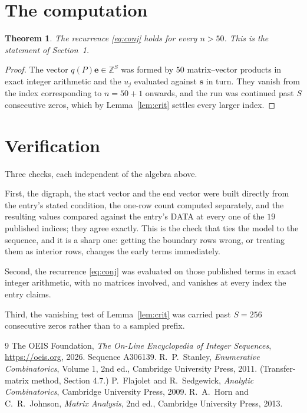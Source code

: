 \documentclass[11pt,a4paper]{article}
\theoremstyle{plain}
\newtheorem{theorem}{Theorem}
\theoremstyle{definition}
\begin{document}
\section{The computation}

\begin{theorem}
The recurrence \eqref{eq:conj} holds for every $n>50$. This is the statement of
Section~1.
\end{theorem}

\begin{proof}
The vector $q(P)\mathbf{e}\in\mathbb{Z}^{S}$ was formed by $50$ matrix--vector
products in exact integer arithmetic and the $u_j$ evaluated against $\mathbf{s}$ in turn.
They vanish from the index corresponding to $n=50+1$ onwards, and the run was continued
past $S$ consecutive zeros, which by Lemma~\ref{lem:crit} settles every larger index.
\end{proof}

\section{Verification}

Three checks, each independent of the algebra above.

First, the digraph, the start vector and the end vector were built directly from the
entry's stated condition, the one-row count computed separately, and the resulting values
compared against the entry's DATA at every one of the $19$ published indices; they
agree exactly. This is the check that ties the model to the sequence, and it is a sharp one:
getting the boundary rows wrong, or treating them as interior rows, changes the early terms
immediately.

Second, the recurrence \eqref{eq:conj} was evaluated on those published terms in exact
integer arithmetic, with no matrices involved, and vanishes at every index the entry claims.

Third, the vanishing test of Lemma~\ref{lem:crit} was carried past $S=256$ consecutive
zeros rather than to a sampled prefix.

\begin{thebibliography}{9}
 The OEIS Foundation, \emph{The On-Line Encyclopedia of Integer
Sequences}, \url{https://oeis.org}, 2026. Sequence A306139.
 R.~P.~Stanley, \emph{Enumerative Combinatorics}, Volume 1, 2nd ed.,
Cambridge University Press, 2011. (Transfer-matrix method, Section 4.7.)
 P.~Flajolet and R.~Sedgewick, \emph{Analytic Combinatorics}, Cambridge
University Press, 2009.
 R.~A.~Horn and C.~R.~Johnson, \emph{Matrix Analysis}, 2nd ed., Cambridge
University Press, 2013.
\end{thebibliography}
\end{document}
